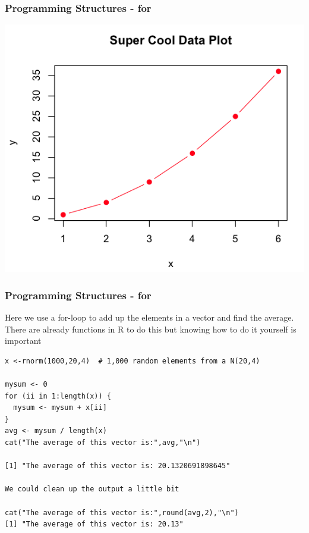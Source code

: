 \documentclass{beamer}
\begin{document}
%

\begin{frame}[fragile]
\frametitle{Programming Structures - for }
\begin{center}
\includegraphics{../IMG/parab.png}
\end{center}
\end{frame}


%

\begin{frame}[fragile]
\frametitle{Programming Structures - for }
Here we use a for-loop to add up the elements in a vector and find the average. There are already functions in R to do this but knowing how to do it yourself is important
\footnotesize
\begin{verbatim}
x <-rnorm(1000,20,4)  # 1,000 random elements from a N(20,4)

mysum <- 0
for (ii in 1:length(x)) {
  mysum <- mysum + x[ii]
}
avg <- mysum / length(x)
cat("The average of this vector is:",avg,"\n")

[1] "The average of this vector is: 20.1320691898645"

We could clean up the output a little bit

cat("The average of this vector is:",round(avg,2),"\n")
[1] "The average of this vector is: 20.13"

\end{verbatim}
\end{frame}

%
\end{document}

